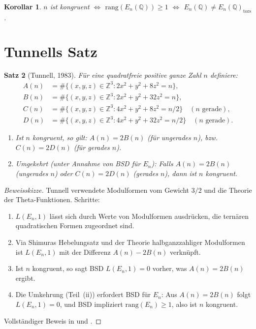 \documentclass[12pt,a4paper]{amsart}
\newtheorem{theorem}{Satz}[section]
\newtheorem{corollary}[theorem]{Korollar}
\theoremstyle{definition}
\newcommand{\Z}{\mathbb{Z}}
\newcommand{\Q}{\mathbb{Q}}
\begin{document}
\begin{corollary}
$n$ ist kongruent $\iff$ $\mathrm{rang}(E_n(\Q)) \ge 1$
$\iff$ $E_n(\Q) \ne E_n(\Q)_{\mathrm{tors}}$.
\end{corollary}

\section{Tunnells Satz}

\begin{theorem}[Tunnell, 1983]
\label{thm:tunnell}
F\"ur eine quadratfreie positive ganze Zahl $n$ definiere:
\begin{align*}
  A(n) &= \#\{(x,y,z) \in \Z^3 : 2x^2 + y^2 + 8z^2 = n\}, \\
  B(n) &= \#\{(x,y,z) \in \Z^3 : 2x^2 + y^2 + 32z^2 = n\}, \\
  C(n) &= \#\{(x,y,z) \in \Z^3 : 4x^2 + y^2 + 8z^2 = n/2\}
  \quad (n \text{ gerade}), \\
  D(n) &= \#\{(x,y,z) \in \Z^3 : 4x^2 + y^2 + 32z^2 = n/2\}
  \quad (n \text{ gerade}).
\end{align*}
\begin{enumerate}
  \item[\textup{(i)}] Ist $n$ kongruent, so gilt:
    $A(n) = 2B(n)$ (f\"ur ungerades $n$), bzw.\
    $C(n) = 2D(n)$ (f\"ur gerades $n$).
  \item[\textup{(ii)}] Umgekehrt (unter Annahme von BSD f\"ur $E_n$):
    Falls $A(n) = 2B(n)$ (ungerades $n$) oder $C(n) = 2D(n)$ (gerades $n$),
    dann ist $n$ kongruent.
\end{enumerate}
\end{theorem}

\begin{proof}[Beweisskizze]
Tunnell \cite{Tunnell1983} verwendete Modulformen vom Gewicht $3/2$ und
die Theorie der Theta-Funktionen.
Schritte:
\begin{enumerate}
  \item $L(E_n, 1)$ l\"asst sich durch Werte von Modulformen
    ausdr\"ucken, die tern\"aren quadratischen Formen zugeordnet sind.
  \item Via Shimuras Hebelungsatz und der Theorie halbganzzahliger
    Modulformen ist $L(E_n,1)$ mit der Differenz $A(n)-2B(n)$ verkn\"upft.
  \item Ist $n$ kongruent, so sagt BSD $L(E_n,1) = 0$ vorher,
    was $A(n) = 2B(n)$ ergibt.
  \item Die Umkehrung (Teil~(ii)) erfordert BSD f\"ur $E_n$:
    Aus $A(n)=2B(n)$ folgt $L(E_n,1)=0$, und BSD impliziert
    $\mathrm{rang}(E_n) \ge 1$, also ist $n$ kongruent.
\end{enumerate}
Vollst\"andiger Beweis in \cite{Tunnell1983} und \cite{Koblitz1984}.
\end{proof}
\end{document}

